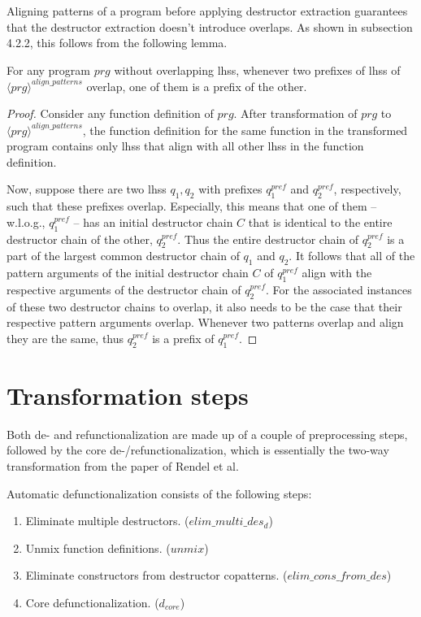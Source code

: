 Aligning patterns of a program before applying destructor extraction guarantees that the destructor extraction doesn't introduce overlaps. As shown in subsection 4.2.2, this follows from the following lemma.

\begin{lemma}
For any program $prg$ without overlapping lhss, whenever two prefixes of lhss of $\langle prg \rangle^{align\_patterns}$ overlap, one of them is a prefix of the other.

\begin{proof}
Consider any function definition of $prg$. After transformation of $prg$ to $\langle prg \rangle^{align\_patterns}$, the function definition for the same function in the transformed program contains only lhss that align with all other lhss in the function definition.

Now, suppose there are two lhss $q_1, q_2$ with prefixes $q^{\mathit{pref}}_1$ and $q^{\mathit{pref}}_2$, respectively, such that these prefixes overlap. Especially, this means that one of them -- w.l.o.g., $q^{\mathit{pref}}_1$ -- has an initial destructor chain $C$ that is identical to the entire destructor chain of the other, $q^{\mathit{pref}}_2$. Thus the entire destructor chain of $q^{\mathit{pref}}_2$ is a part of the largest common destructor chain of $q_1$ and $q_2$. It follows that all of the pattern arguments of the initial destructor chain $C$ of $q^{\mathit{pref}}_1$ align with the respective arguments of the destructor chain of $q^{\mathit{pref}}_2$. For the associated instances of these two destructor chains to overlap, it also needs to be the case that their respective pattern arguments overlap. Whenever two patterns overlap and align they are the same, thus $q^{\mathit{pref}}_2$ is a prefix of $q^{\mathit{pref}}_1$.
\end{proof}
\end{lemma}

\section{Transformation steps}

Both de- and refunctionalization are made up of a couple of preprocessing steps, followed by the core de-/refunctionalization, which is essentially the two-way transformation from the paper of Rendel et al.

Automatic defunctionalization consists of the following steps:
\begin{enumerate}
\item Eliminate multiple destructors. ($elim\_multi\_des_d$)

\item Unmix function definitions. ($unmix$)

\item Eliminate constructors from destructor copatterns. ($elim\_cons\_from\_des$)

\item Core defunctionalization. ($d_{core}$)

\end{enumerate}

